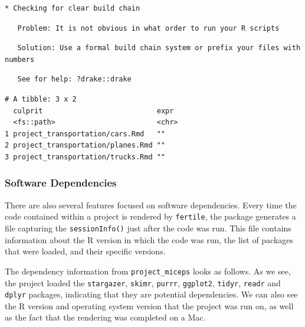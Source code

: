 \documentclass[12pt,twoside]{reedthesis}
\begin{document}
\begin{verbatim}
* Checking for clear build chain
\end{verbatim}
\begin{verbatim}
   Problem: It is not obvious in what order to run your R scripts
\end{verbatim}
\begin{verbatim}
   Solution: Use a formal build chain system or prefix your files with numbers
\end{verbatim}
\begin{verbatim}
   See for help: ?drake::drake
\end{verbatim}
\begin{verbatim}
# A tibble: 3 x 2
  culprit                           expr 
  <fs::path>                        <chr>
1 project_transportation/cars.Rmd   ""   
2 project_transportation/planes.Rmd ""   
3 project_transportation/trucks.Rmd ""   
\end{verbatim}
\hypertarget{software-dependencies}{%
\subsubsection{Software Dependencies}\label{software-dependencies}}

There are also several features focused on software dependencies. Every time the code contained within a project is rendered by \texttt{fertile}, the package generates a file capturing the \texttt{sessionInfo()} just after the code was run. This file contains information about the R version in which the code was run, the list of packages that were loaded, and their specific versions.

The dependency information from \texttt{project\_miceps} looks as follows. As we see, the project loaded the \texttt{stargazer}, \texttt{skimr}, \texttt{purrr}, \texttt{ggplot2}, \texttt{tidyr}, \texttt{readr} and \texttt{dplyr} packages, indicating that they are potential dependencies. We can also see the R version and operating system version that the project was run on, as well as the fact that the rendering was completed on a Mac.
\end{document}
